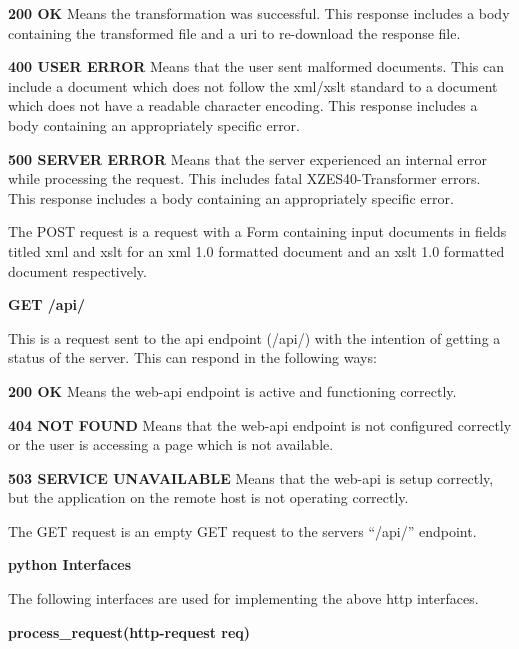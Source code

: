 \begin{description}
  \item {
      \textbf{200 OK}  Means the transformation was successful.
        This response includes a body containing the transformed file and a \gls{uri} to re-download the response file.
    }
    \item {
      \textbf{400 USER ERROR} Means that the user sent malformed documents.
        This can include a document which does not follow the \gls{xml}/\gls{xslt} standard to a document which does not have a readable character encoding.
        This response includes a body containing an appropriately specific error.
    }
    \item {
      \textbf{500 SERVER ERROR} Means that the server experienced an internal error while processing the request.
         This includes fatal XZES40-Transformer errors.
        This response includes a body containing an appropriately specific error.
    }
\end{description}

The POST request is a request with a Form containing input documents in fields titled \gls{xml} and \gls{xslt} for an \gls{xml} 1.0 formatted document and an \gls{xslt} 1.0 formatted document respectively.

\textbf{GET /api/}

This is a request sent to the \gls{api} endpoint (/api/) with the intention of getting a status of the server. This can respond in the following ways:

\begin{description}
  \item \textbf{200 OK} Means the \gls{web-api} endpoint is active and functioning correctly.
    \item \textbf{404 NOT FOUND} Means that the \gls{web-api} endpoint is not configured correctly or the user is accessing a page which is not available.
    \item \textbf{503 SERVICE UNAVAILABLE} Means that the \gls{web-api} is setup correctly, but the application on the remote host is not operating correctly.
\end{description}

The GET request is an empty GET request to the servers ``/api/'' endpoint.

\textbf{\gls{python} Interfaces}

The following interfaces are used for implementing the above \gls{http} interfaces.

\textbf{process\_request(http-request req)}

